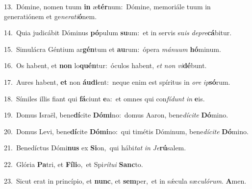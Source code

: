 {\numbfont\textcolor{\numbcolor}{13.}}~Dómine, nomen tuum \textbf{in} æ\-\textbf{tér}\-num:~\star Dómine, memoriále tuum in generatiónem et ge\-\textit{ne}\-\textit{ra}\textit{ti}\textbf{ó}nem.\par
{\numbfont\textcolor{\numbcolor}{14.}}~Quia judicábit Dóminus \textbf{pó}\-pulum \textbf{su}\-um:~\star et in servis su\textit{is} \textit{de}\-\textit{pre}\textbf{cá}bitur.\par
{\numbfont\textcolor{\numbcolor}{15.}}~Simulácra Géntium ar\-\textbf{gén}\-tum et \textbf{au}\-rum:~\star ópera \textit{má}\-\textit{nu}\textit{um} \textbf{hó}\-minum.\par
{\numbfont\textcolor{\numbcolor}{16.}}~Os habent, et \textbf{non} lo\-\textbf{quén}\-tur:~\star óculos habent, \textit{et} \textit{non} \textit{vi}\-\textbf{dé}bunt.\par
{\numbfont\textcolor{\numbcolor}{17.}}~Aures habent, \textbf{et} non \textbf{áu}\-\textbf{di}ent:~\star neque enim est spíritus in \textit{o}\-\textit{re} \textit{ip}\-\textbf{só}rum.\par
{\numbfont\textcolor{\numbcolor}{18.}}~Símiles illis fiant qui \textbf{fá}\-ciunt \textbf{e}\-a:~\star et omnes qui con\-\textit{fí}\-\textit{dunt} \textit{in} \textbf{e}\-is.\par
{\numbfont\textcolor{\numbcolor}{19.}}~Domus Israël, bene\-\textbf{dí}\-cite \textbf{Dó}\-\textbf{mi}no:~\star domus Aaron, bene\-\textit{dí}\-\textit{ci}\textit{te} \textbf{Dó}\-mino.\par
{\numbfont\textcolor{\numbcolor}{20.}}~Domus Levi, bene\-\textbf{dí}\-cite \textbf{Dó}\-\textbf{mi}no:~\star qui timétis Dóminum, bene\-\textit{dí}\-\textit{ci}\textit{te} \textbf{Dó}\-mino.\par
{\numbfont\textcolor{\numbcolor}{21.}}~Benedíctus Dómi\textbf{nus} ex \textbf{Si}\-on,~\star qui hábi\textit{tat} \textit{in} \textit{Je}\-\textbf{rú}salem.\par
{\numbfont\textcolor{\numbcolor}{22.}}~Glória \textbf{Pa}\-tri, et \textbf{Fí}\-\textbf{li}o,~\star et Spi\-\textit{rí}\-\textit{tu}\textit{i} \textbf{Sanc}\-to.\par
{\numbfont\textcolor{\numbcolor}{23.}}~Sicut erat in princípio, et \textbf{nunc}\-, et \textbf{sem}\-per,~\star et in sǽcula sæ\-\textit{cu}\-\textit{ló}\textit{rum}. \textbf{A}\-men.\par

